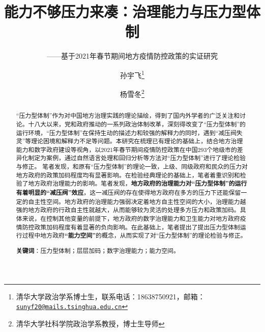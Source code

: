 \documentclass[
  12pt,
]{ctexart}
\title{能力不够压力来凑：治理能力与压力型体制}
\subtitle{------基于2021年春节期间地方疫情防控政策的实证研究}
\author{孙宇飞\footnote{清华大学政治学系博士生，联系电话：18638750921，邮箱：\href{mailto:sunyf20@mails.tsinghua.edu.cn}{\nolinkurl{sunyf20@mails.tsinghua.edu.cn}}} \and 杨雪冬\footnote{清华大学社科学院政治学系教授，博士生导师}}
\date{}
\begin{document}
\maketitle
\begin{abstract}
``压力型体制''作为对中国地方治理实践的理论描绘，得到了国内外学者的广泛关注和讨论。十八大以来，党和政府推动的一系列政治体制改革，深刻得改变了``压力型体制''的运行环境，``压力型体制''在保持生动的描述力和较强的解释力的同时，遇到``减压阀失灵''等理论困境和解释力不足等问题。本研究在梳理已有理论的基础上，结合地方治理能力和数字政府建设等视角，以2021年春节期间疫情防控政策在中国293个地级市的差异化制定为案例，通过自然语言处理和回归分析等方法对``压力型体制''进行了理论检验与修正。
笔者发现，和原有``压力型体制''的理论一致，上级、同级政府和民众的压力对地方政府的政策加码程度均有显著影响。在检验经典理论的基础上，笔者着重识别和检验了地方政府治理能力的影响。笔者发现，\textbf{地方政府的治理能力对``压力型体制''的运行有着明显的``减压阀''效应}，这一减压阀的存在使得地方政府在多方的压力下还能保留一定的自主性空间。地方政府的治理能力强弱决定着地方自主性空间的大小，治理能力越强的地方政府的行政自主性就越大，从而能够较为灵活的处理多方压力和政策加码。具体来说，在控制其他变量的前提下，地方政府的数字治理能力和卫生能力对地方政府疫情防控政策加码程度有着显著的负向影响。在此基础上，笔者提出了提出压力型体制运行过程中地方政府\textbf{``能力空间''}的概念，从而实现了对``压力型体制''的理论检验与修正。

\textbf{关键词}：压力型体制；层层加码；数字治理能力；能力空间。
\end{abstract}
\end{document}
